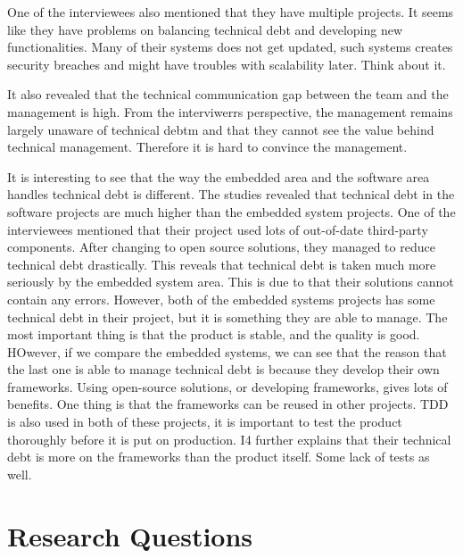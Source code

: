 One of the interviewees also mentioned that they have multiple projects. It seems like they have problems on balancing technical debt and developing new functionalities. Many of their systems does not get updated, such systems creates security breaches and might have troubles with scalability later. Think about it.

It also revealed that the technical communication gap between the team and the management is high. From the interviwerrs perspective, the management remains largely unaware of technical debtm and that they cannot see the value behind technical management. Therefore it is hard to convince the management. 

It is interesting to see that the way the embedded area and the software area handles technical debt is different. The studies revealed that technical debt in the software projects are much higher than the embedded system projects. One of the interviewees mentioned that their project used lots of out-of-date third-party components. After changing to open source solutions, they managed to reduce technical debt drastically. This reveals that technical debt is taken much more seriously by the embedded system area. This is due to that their solutions cannot contain any errors. However, both of the embedded systems projects has some technical debt in their project, but it is something they are able to manage. The most important thing is that the product is stable, and the quality is good. HOwever, if we compare the embedded systems, we can see that the reason that the last one is able to manage technical debt is because they develop their own frameworks. Using open-source solutions, or developing frameworks, gives lots of benefits. One thing is that the frameworks can be reused in other projects. TDD is also used in both of these projects, it is important to test the product thoroughly before it is put on production. I4 further explains that their technical debt is more on the frameworks than the product itself. Some lack of tests as well.


\section{Research Questions}


